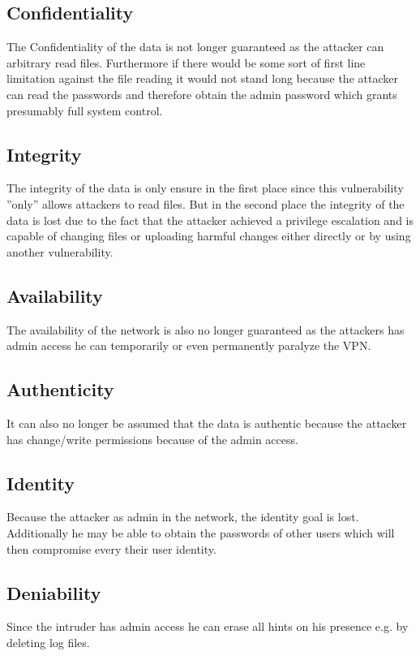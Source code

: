 \subsection{Confidentiality}
The Confidentiality of the data is not longer guaranteed as the attacker can arbitrary read files. Furthermore if there would be some sort of first line limitation against the file reading it would not stand long because the attacker can read the passwords and therefore obtain the admin password which grants presumably full system control.

\subsection{Integrity}
The integrity of the data is only ensure in the first place since this vulnerability ''only'' allows attackers to read files. But in the second place the integrity of the data is lost due to the fact that the attacker achieved a privilege escalation and is capable of changing files or uploading harmful changes either directly or by using another vulnerability.

\subsection{Availability}
The availability of the network is also no longer guaranteed as the attackers has admin access he can temporarily or even permanently paralyze the VPN.

\subsection{Authenticity}
It can also no longer be assumed that the data is authentic because the attacker has change/write permissions because of the admin access.

\subsection{Identity}
Because the attacker as admin in the network, the identity goal is lost. Additionally he may be able to obtain the passwords of other users which will then compromise every their user identity.

\subsection{Deniability}
Since the intruder has admin access he can erase all hints on his presence e.g. by deleting log files.

